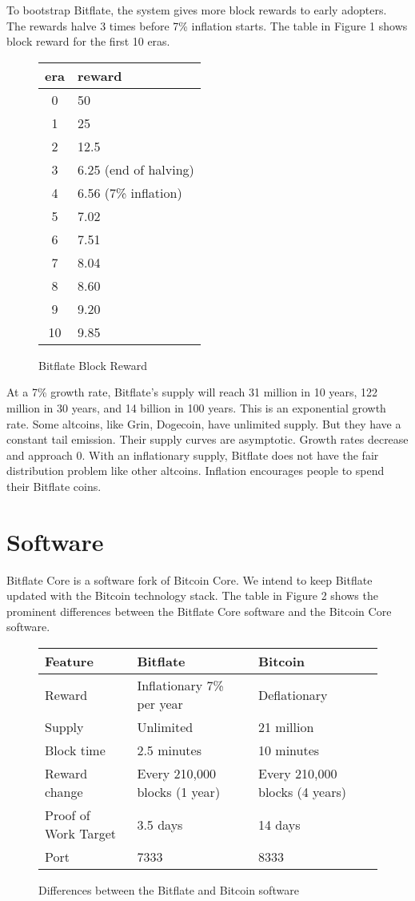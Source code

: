\documentclass{article}      %
\begin{document}
To bootstrap Bitflate, the system gives more block rewards to early adopters. The rewards halve 3 times before 7\% inflation starts. The table in Figure 1 shows block reward for the first 10 eras.

\begin{figure}[h]
\centering
\begin{tabular}{ |c|l| } 
 \hline
 era & reward \\
 \hline
 0  & 50 \\
 1 & 25 \\
 2 & 12.5 \\
 3 & 6.25 (end of halving) \\
 4 & 6.56 (7\% inflation) \\
 5 & 7.02 \\
 6 & 7.51 \\
 7 & 8.04 \\
 8 & 8.60 \\
 9 & 9.20 \\
 10 & 9.85 \\
 \hline
\end{tabular}
\caption{Bitflate Block Reward}
\end{figure}

At a 7\% growth rate, Bitflate's supply will reach 31 million in 10 years, 122 million in 30 years, and 14 billion in 100 years. This is an exponential growth rate. Some altcoins, like Grin, Dogecoin, have unlimited supply. But they have a constant tail emission. Their supply curves are asymptotic. Growth rates decrease and approach 0. With an inflationary supply, Bitflate does not have the fair distribution problem like other altcoins. Inflation encourages people to spend their Bitflate coins.

\section{Software}

Bitflate Core is a software fork of Bitcoin Core. We intend to keep Bitflate updated with the Bitcoin technology stack. The table in Figure 2 shows the prominent differences between the Bitflate Core software and the Bitcoin Core software.

\begin{figure}[h]
\centering
\begin{tabular}{ |l|l|l| } 
 \hline
 Feature & Bitflate & Bitcoin \\
 \hline
 Reward & Inflationary 7\% per year & Deflationary \\
 \hline
 Supply & Unlimited & 21 million \\
 \hline
 Block time & 2.5 minutes & 10 minutes \\
 \hline
 Reward change & Every 210,000 blocks (1 year) & Every 210,000 blocks (4 years) \\
 \hline
 Proof of Work Target & 3.5 days & 14 days \\
 \hline
 Port & 7333 & 8333 \\
 \hline
\end{tabular}
\caption{Differences between the Bitflate and Bitcoin software}
\end{figure}
\end{document}
